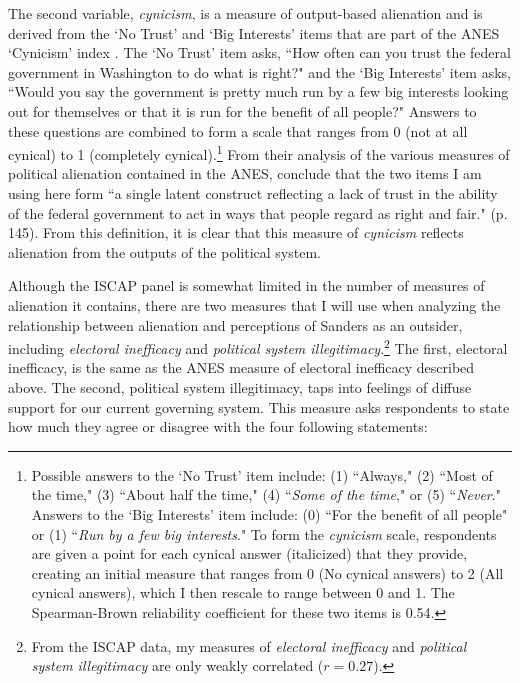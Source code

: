 \documentclass[12pt]{article}
\begin{document}
The second variable, \textit{cynicism}, is a measure of output-based alienation and is derived from the `No Trust' and `Big Interests' items that are part of the ANES `Cynicism' index \parencite{mason1985}. The `No Trust' item asks, ``How often can you trust the federal government in Washington to do what is right?" and the `Big Interests' item asks, ``Would you say the government is pretty much run by a few big interests looking out for themselves or that it is run for the benefit of all people?" Answers to these questions are combined to form a scale that ranges from 0 (not at all cynical) to 1 (completely cynical).\footnote{Possible answers to the `No Trust' item include: (1) ``Always," (2) ``Most of the time," (3) ``About half the time," (4) ``\textit{Some of the time}," or (5) ``\textit{Never}." Answers to the `Big Interests' item include: (0) ``For the benefit of all people" or (1) ``\textit{Run by a few big interests}." To form the \textit{cynicism} scale, respondents are given a point for each cynical answer (italicized) that they provide, creating an initial measure that ranges from 0 (No cynical answers) to 2 (All cynical answers), which I then rescale to range between 0 and 1. The Spearman-Brown reliability coefficient for these two items is 0.54.} From their analysis of the various measures of political alienation contained in the ANES, \textcite{mason1985} conclude that the two items I am using here form ``a single latent construct reflecting a lack of trust in the ability of the federal government to act in ways that people regard as right and fair." (p. 145). From this definition, it is clear that this measure of \textit{cynicism} reflects alienation from the outputs of the political system. 

Although the ISCAP panel is somewhat limited in the number of measures of alienation it contains, there are two measures that I will use when analyzing the relationship between alienation and perceptions of Sanders as an outsider, including \textit{electoral inefficacy} and \textit{political system illegitimacy}.\footnote{From the ISCAP data, my measures of \textit{electoral inefficacy} and \textit{political system illegitimacy} are only weakly correlated ($r = 0.27$).} The first, electoral inefficacy, is the same as the ANES measure of electoral inefficacy described above. The second, political system illegitimacy, taps into feelings of diffuse support for our current governing system. This measure asks respondents to state how much they agree or disagree with the four following statements:
\end{document}
